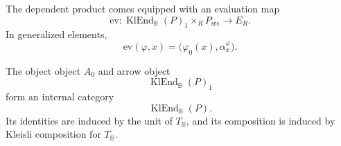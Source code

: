 The dependent product comes equipped with an evaluation map
\[
    \mathrm{ev}:
    \operatorname{KlEnd}_{\mathbb B}(P)_1
    \times_R
    P_{\mathrm{src}}
    \longrightarrow
    E_R.
\]
In generalized elements,
\[
    \mathrm{ev}(\varphi,x)
    =
    \bigl(\varphi_0(x),\alpha^\varphi_x\bigr).
\]

\begin{proposition}
\label{prop:klend-internal-category}
    The object object \(A_0\) and arrow object
    \[
        \operatorname{KlEnd}_{\mathbb B}(P)_1
    \]
    form an internal category
    \[
        \operatorname{KlEnd}_{\mathbb B}(P).
    \]
    Its identities are induced by the unit of \(T_{\mathbb B}\), and its
    composition is induced by Kleisli composition for \(T_{\mathbb B}\).
\end{proposition}

